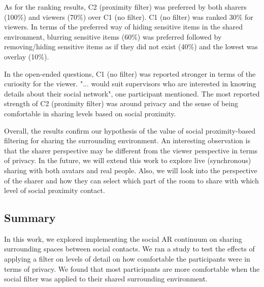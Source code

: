 As for the ranking results, C2 (proximity filter) was preferred by both sharers (100\%) and viewers (70\%) over C1 (no filter). C1 (no filter) was ranked 30\% for viewers. In terms of the preferred way of hiding sensitive items in the shared environment, blurring sensitive items (60\%) was preferred followed by removing/hiding sensitive items as if they did not exist (40\%) and the lowest was overlay (10\%). 

In the open-ended questions, C1 (no filter) was reported stronger in terms of the curiosity for the viewer. "... would suit supervisors who are interested in knowing details about their social network", one participant mentioned. The most reported strength of C2 (proximity filter) was around privacy and the sense of being comfortable in sharing levels based on social proximity. 

Overall, the results confirm our hypothesis of the value of social proximity-based filtering for sharing the surrounding environment. An interesting observation is that the sharer perspective may be different from the viewer perspective in terms of privacy. In the future, we will extend this work to explore live (synchronous) sharing with both avatars and real people. Also, we will look into the perspective of the sharer and how they can select which part of the room to share with which level of social proximity contact.

\subsection{Summary}

In this work, we explored implementing the social AR continuum on sharing surrounding spaces between social contacts. We ran a study to test the effects of applying a filter on levels of detail on how comfortable the participants were in terms of privacy. We found that most participants are more comfortable when the social filter was applied to their shared surrounding environment. 